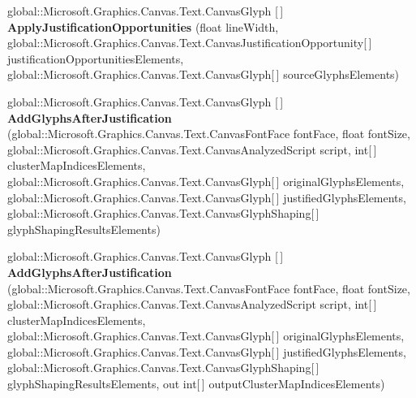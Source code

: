 \begin{DoxyCompactItemize}
\item 
\mbox{\label{class_microsoft_1_1_graphics_1_1_canvas_1_1_text_1_1_canvas_text_analyzer_a46e9ecbf797abc6031411602e6c4d80e}} 
global\+::\+Microsoft.\+Graphics.\+Canvas.\+Text.\+Canvas\+Glyph \mbox{[}$\,$\mbox{]} {\bfseries Apply\+Justification\+Opportunities} (float line\+Width, global\+::\+Microsoft.\+Graphics.\+Canvas.\+Text.\+Canvas\+Justification\+Opportunity\mbox{[}$\,$\mbox{]} justification\+Opportunities\+Elements, global\+::\+Microsoft.\+Graphics.\+Canvas.\+Text.\+Canvas\+Glyph\mbox{[}$\,$\mbox{]} source\+Glyphs\+Elements)
\item 
\mbox{\label{class_microsoft_1_1_graphics_1_1_canvas_1_1_text_1_1_canvas_text_analyzer_ac713992346afb6a64bca95d05ee3ac94}} 
global\+::\+Microsoft.\+Graphics.\+Canvas.\+Text.\+Canvas\+Glyph \mbox{[}$\,$\mbox{]} {\bfseries Add\+Glyphs\+After\+Justification} (global\+::\+Microsoft.\+Graphics.\+Canvas.\+Text.\+Canvas\+Font\+Face font\+Face, float font\+Size, global\+::\+Microsoft.\+Graphics.\+Canvas.\+Text.\+Canvas\+Analyzed\+Script script, int\mbox{[}$\,$\mbox{]} cluster\+Map\+Indices\+Elements, global\+::\+Microsoft.\+Graphics.\+Canvas.\+Text.\+Canvas\+Glyph\mbox{[}$\,$\mbox{]} original\+Glyphs\+Elements, global\+::\+Microsoft.\+Graphics.\+Canvas.\+Text.\+Canvas\+Glyph\mbox{[}$\,$\mbox{]} justified\+Glyphs\+Elements, global\+::\+Microsoft.\+Graphics.\+Canvas.\+Text.\+Canvas\+Glyph\+Shaping\mbox{[}$\,$\mbox{]} glyph\+Shaping\+Results\+Elements)
\item 
\mbox{\label{class_microsoft_1_1_graphics_1_1_canvas_1_1_text_1_1_canvas_text_analyzer_a56ac0832bd71ab5cce968f4d89e08b44}} 
global\+::\+Microsoft.\+Graphics.\+Canvas.\+Text.\+Canvas\+Glyph \mbox{[}$\,$\mbox{]} {\bfseries Add\+Glyphs\+After\+Justification} (global\+::\+Microsoft.\+Graphics.\+Canvas.\+Text.\+Canvas\+Font\+Face font\+Face, float font\+Size, global\+::\+Microsoft.\+Graphics.\+Canvas.\+Text.\+Canvas\+Analyzed\+Script script, int\mbox{[}$\,$\mbox{]} cluster\+Map\+Indices\+Elements, global\+::\+Microsoft.\+Graphics.\+Canvas.\+Text.\+Canvas\+Glyph\mbox{[}$\,$\mbox{]} original\+Glyphs\+Elements, global\+::\+Microsoft.\+Graphics.\+Canvas.\+Text.\+Canvas\+Glyph\mbox{[}$\,$\mbox{]} justified\+Glyphs\+Elements, global\+::\+Microsoft.\+Graphics.\+Canvas.\+Text.\+Canvas\+Glyph\+Shaping\mbox{[}$\,$\mbox{]} glyph\+Shaping\+Results\+Elements, out int\mbox{[}$\,$\mbox{]} output\+Cluster\+Map\+Indices\+Elements)

\end{DoxyCompactItemize}
